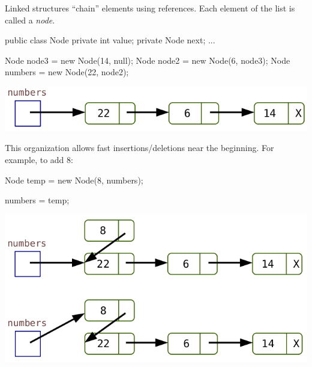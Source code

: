 
Linked structures ``chain'' elements using references.
Each element of the list is called a \emph{node}.

\vspace{1ex}
\begin{minipage}{0.40\linewidth}
\begin{javalst}
    public class Node
    {
        private int value;
        private Node next;
        ...
    }
\end{javalst}
\end{minipage}
\hfill
\begin{minipage}{0.58\linewidth}
\begin{javalst}
    Node node3 = new Node(14, null);
    Node node2 = new Node(6, node3);
    Node numbers = new Node(22, node2);
\end{javalst}
\includegraphics[scale=0.35]{figs/list1.png}
\end{minipage}
\vspace{1em}

This organization allows fast insertions/deletions near the beginning. For example, to add 8:

\vspace{1ex}
\begin{minipage}{0.48\linewidth}
\begin{javalst}
    Node temp = new Node(8, numbers);



    numbers = temp;
\end{javalst}
\end{minipage}
\hfill
\begin{minipage}{0.50\linewidth}
\includegraphics[scale=0.35]{figs/list2.png}
\end{minipage}
\vspace{1em}


